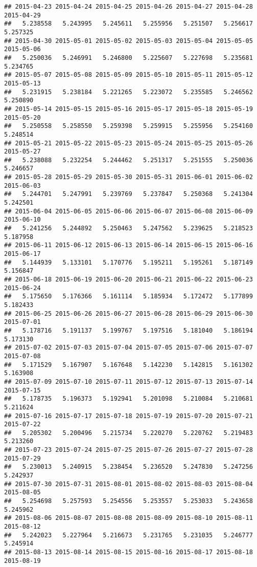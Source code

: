 \documentclass[
]{article}
\begin{document}
\begin{verbatim}
## 2015-04-23 2015-04-24 2015-04-25 2015-04-26 2015-04-27 2015-04-28 2015-04-29 
##   5.238558   5.243995   5.245611   5.255956   5.251507   5.256617   5.257325 
## 2015-04-30 2015-05-01 2015-05-02 2015-05-03 2015-05-04 2015-05-05 2015-05-06 
##   5.250036   5.246991   5.246800   5.225607   5.227698   5.235681   5.234765 
## 2015-05-07 2015-05-08 2015-05-09 2015-05-10 2015-05-11 2015-05-12 2015-05-13 
##   5.231915   5.238184   5.221265   5.223072   5.235585   5.246562   5.250890 
## 2015-05-14 2015-05-15 2015-05-16 2015-05-17 2015-05-18 2015-05-19 2015-05-20 
##   5.250558   5.258550   5.259398   5.259915   5.255956   5.254160   5.248514 
## 2015-05-21 2015-05-22 2015-05-23 2015-05-24 2015-05-25 2015-05-26 2015-05-27 
##   5.238088   5.232254   5.244462   5.251317   5.251555   5.250036   5.246657 
## 2015-05-28 2015-05-29 2015-05-30 2015-05-31 2015-06-01 2015-06-02 2015-06-03 
##   5.244701   5.247991   5.239769   5.237847   5.250368   5.241304   5.242501 
## 2015-06-04 2015-06-05 2015-06-06 2015-06-07 2015-06-08 2015-06-09 2015-06-10 
##   5.241256   5.244892   5.250463   5.247562   5.239625   5.218523   5.187958 
## 2015-06-11 2015-06-12 2015-06-13 2015-06-14 2015-06-15 2015-06-16 2015-06-17 
##   5.144939   5.133101   5.170776   5.195211   5.195261   5.187149   5.156847 
## 2015-06-18 2015-06-19 2015-06-20 2015-06-21 2015-06-22 2015-06-23 2015-06-24 
##   5.175650   5.176366   5.161114   5.185934   5.172472   5.177899   5.182433 
## 2015-06-25 2015-06-26 2015-06-27 2015-06-28 2015-06-29 2015-06-30 2015-07-01 
##   5.178716   5.191137   5.199767   5.197516   5.181040   5.186194   5.173130 
## 2015-07-02 2015-07-03 2015-07-04 2015-07-05 2015-07-06 2015-07-07 2015-07-08 
##   5.171529   5.167907   5.167648   5.142230   5.142815   5.161302   5.163908 
## 2015-07-09 2015-07-10 2015-07-11 2015-07-12 2015-07-13 2015-07-14 2015-07-15 
##   5.178735   5.196373   5.192941   5.201098   5.210084   5.210681   5.211624 
## 2015-07-16 2015-07-17 2015-07-18 2015-07-19 2015-07-20 2015-07-21 2015-07-22 
##   5.205302   5.200496   5.215734   5.220270   5.220762   5.219483   5.213260 
## 2015-07-23 2015-07-24 2015-07-25 2015-07-26 2015-07-27 2015-07-28 2015-07-29 
##   5.230013   5.240915   5.238454   5.236520   5.247830   5.247256   5.242937 
## 2015-07-30 2015-07-31 2015-08-01 2015-08-02 2015-08-03 2015-08-04 2015-08-05 
##   5.254698   5.257593   5.254556   5.253557   5.253033   5.243658   5.245962 
## 2015-08-06 2015-08-07 2015-08-08 2015-08-09 2015-08-10 2015-08-11 2015-08-12 
##   5.242023   5.227964   5.216673   5.231765   5.231035   5.246777   5.245914 
## 2015-08-13 2015-08-14 2015-08-15 2015-08-16 2015-08-17 2015-08-18 2015-08-19 

\end{verbatim}
\end{document}
